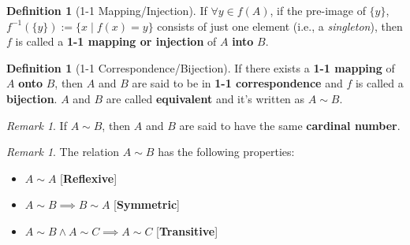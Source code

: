 \documentclass[a4paper,12pt]{report}
\newcommand{\tb}{\textbf}
\theoremstyle{plain}
\theoremstyle{definition}
\newtheorem{definition}[theorem]{\color{red}Definition} %
\theoremstyle{remark}
\newtheorem{remark}[theorem]{\color{ForestGreen}Remark} %
\begin{document}
\begin{definition}[1-1 Mapping/Injection]
If $\forall y\in f(A)$, if the pre-image of $\{y\}$, $f^{-1}(\{y\}):= \{x\mid f(x)=y\}$ consists of just one element (i.e., a \emph{singleton}), then $f$ is called a \tb{1-1 mapping or injection} of $A$ \tb{into} $B$.
\end{definition}
\begin{definition}[1-1 Correspondence/Bijection]
If there exists a \tb{1-1 mapping} of $A$ \tb{onto} $B$, then $A$ and $B$ are said to be in \tb{1-1 correspondence} and $f$ is called a \tb{bijection}. $A$ and $B$ are called \tb{equivalent} and it's written as $A\sim B$.
\end{definition}
\begin{remark}
If $A\sim B$, then $A$ and $B$ are said to have the same \tb{cardinal number}.
\end{remark}
\begin{remark} 
The relation $A\sim B$ has the following properties:
\begin{itemize}
\item $A\sim A$ [\tb{Reflexive}]
\item $A\sim B\implies B\sim A$ [\tb{Symmetric}]
\item $A\sim B\wedge A\sim C\implies A\sim C$ [\tb{Transitive}]
\end{itemize}
\end{remark}
\end{document}
